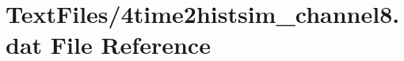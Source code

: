 \hypertarget{4time2histsim__channel8_8dat}{}\section{Text\+Files/4time2histsim\+\_\+channel8.dat File Reference}
\label{4time2histsim__channel8_8dat}
